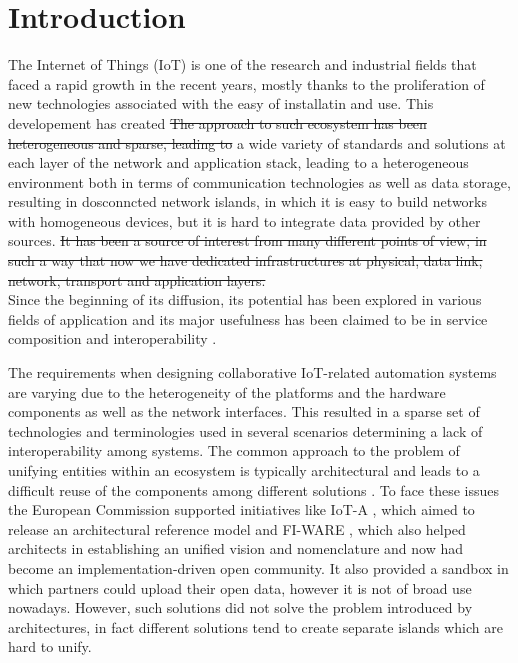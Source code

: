 \section{Introduction}
The Internet of Things (IoT) is one of the research and industrial fields that faced a rapid growth in the recent years, mostly thanks to the proliferation of new technologies associated with the easy of installatin and use. This developement has created \st{The approach to such ecosystem has been heterogeneous and sparse, leading to} a wide variety of standards and solutions at each layer of the network and application stack, leading to a heterogeneous environment both in terms of communication technologies as well as data storage, resulting in dosconncted network islands, in which it is easy to build networks with homogeneous devices, but it is hard to integrate data provided by other sources.
\st{It has been a source of interest from many different points of view, in such a way that now we have dedicated infrastructures at physical, data link, network, transport and application layers.}
\\

Since the beginning of its diffusion, its potential has been explored in various fields of application and its major usefulness has been claimed to be in service composition and interoperability \cite{atzori2010internet}.

The requirements when designing collaborative IoT-related automation systems are varying due to the heterogeneity of the platforms and the hardware components as well as the network interfaces.
This resulted in a sparse set of technologies and terminologies used in several scenarios determining a lack of interoperability among systems.
The common approach to the problem of unifying entities within an ecosystem is typically architectural and leads to a difficult reuse of the components among different solutions \cite{krco2014designing}.
To face these issues the European Commission supported initiatives like IoT-A \cite{iot-a}, which aimed to release an architectural reference model and FI-WARE \cite{fiware}, which also helped architects in establishing an unified vision and nomenclature and now had become an implementation-driven open community.
It also provided a sandbox in which partners could upload their open data, however it is not of broad use nowadays.
However, such solutions did not solve the problem introduced by architectures, in fact different solutions tend to create separate islands which are hard to unify.
\\


